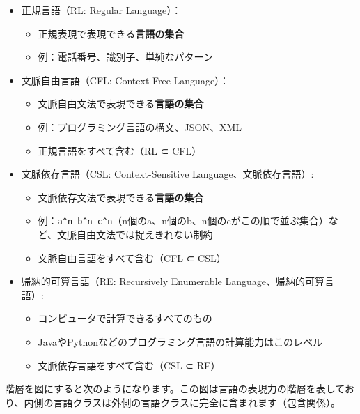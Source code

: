 \begin{itemize}
\tightlist
\item
  正規言語（RL: Regular Language）：

  \begin{itemize}
  \tightlist
  \item
    正規表現で表現できる\textbf{言語の集合}
  \item
    例：電話番号、識別子、単純なパターン
  \end{itemize}
\item
  文脈自由言語（CFL: Context-Free Language）：

  \begin{itemize}
  \tightlist
  \item
    文脈自由文法で表現できる\textbf{言語の集合}
  \item
    例：プログラミング言語の構文、JSON、XML
  \item
    正規言語をすべて含む（RL ⊂ CFL）
  \end{itemize}
\item
  文脈依存言語（CSL: Context-Sensitive Language、文脈依存言語）:

  \begin{itemize}
  \tightlist
  \item
    文脈依存文法で表現できる\textbf{言語の集合}
  \item
    例：\texttt{a\^{}n\ b\^{}n\ c\^{}n}（n個のa、n個のb、n個のcがこの順で並ぶ集合）など、文脈自由文法では捉えきれない制約
  \item
    文脈自由言語をすべて含む（CFL ⊂ CSL）
  \end{itemize}
\item
  帰納的可算言語（RE: Recursively Enumerable Language、帰納的可算言語）:

  \begin{itemize}
  \tightlist
  \item
    コンピュータで計算できるすべてのもの
  \item
    JavaやPythonなどのプログラミング言語の計算能力はこのレベル
  \item
    文脈依存言語をすべて含む（CSL ⊂ RE）
  \end{itemize}
\end{itemize}

階層を図にすると次のようになります。この図は言語の表現力の階層を表しており、内側の言語クラスは外側の言語クラスに完全に含まれます（包含関係）。

